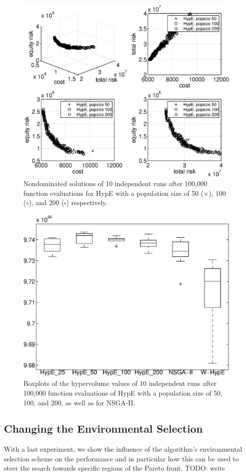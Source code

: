 \documentclass[preprint,12pt]{elsarticle}
\newcommand{\TODO}[1]{{\color{red}TODO: #1}}
\begin{document}
\begin{figure}%
	\includegraphics[width=\columnwidth]{../experiments/randVsCost/diffPopsizes}%
	\caption{\label{fig:popsizes} Nondominated solutions of 10 independent runs after 100,000 function evaluations for HypE with a population size of 50 ($\times$), 100 ($\circ$), and 200 ($\square$) respectively.}
\end{figure}

\begin{figure}%
	\centering
	\includegraphics[width=0.5\columnwidth]{../experiments/randVsCost/hypervolumes/algoComparison}%
	\caption{\label{fig:algocomparison} Boxplots of the hypervolume values of 10 independent runs after 100,000 function evaluations of HypE with a population size of 50, 100, and 200, as well as for NSGA-II.}
\end{figure}

\subsection{Changing the Environmental Selection}
With a last experiment, we show the influence of the algorithm's environmental selection scheme on the performance and in particular how this can be used to steer the search towards specific regions of the Pareto front.
\TODO{write}
\end{document}
